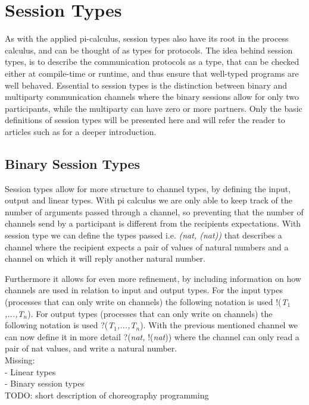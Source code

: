 \section{Session Types}
As with the applied pi-calculus, session types also have its root in the process calculus, and can be thought of as types for protocols. The idea behind session types, is to describe the communication protocols as a type, that can be checked either at compile-time or runtime, and thus ensure that well-typed programs are well behaved. Essential to session types is the distinction between binary and multiparty communication channels where the binary sessions allow for only two participants, while the multiparty can have zero or more partners. Only the basic definitions of session types will be presented here and will refer the reader to articles such as \citeauthor{DBLP:journals/csur/HuttelLVCCDMPRT16} for a deeper introduction. 

\subsection{Binary Session Types}
Session types allow for more structure to channel types, by defining the input, output and linear types. With pi calculus we are only able to keep track of the number of arguments passed through a channel, so preventing that the number of channels send by a participant is different from the recipients expectations. With session type we can define the types passed i.e. \textit{(nat, (nat))} that describes a channel where the recipient expects a pair of values of natural numbers and a channel on which it will reply another natural number.

Furthermore it allows for even more refinement, by including information on how channels are used in relation to input and output types. For the input types (processes that can only write on channels) the following notation is used !(\textit{T$_1$,...,T$_n$}). For output types (processes that can only write on channels) the following notation is used ?(\textit{T$_1$,...,T$_n$}). With the previous mentioned channel we can now define it in more detail ?(\textit{nat, }!(\textit{nat})) where the channel can only read a pair of nat values, and write a natural number. \\ 
Missing: \\
 - Linear types \\
 - Binary session types \\

TODO: short description of choreography programming


